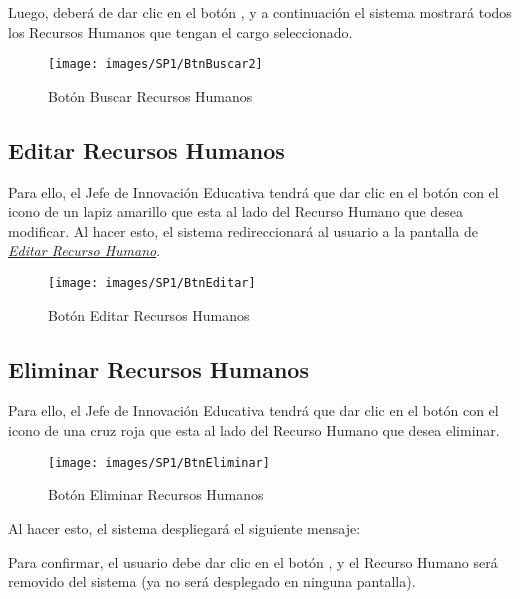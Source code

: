         	Luego, deberá de dar clic en el botón , y a continuación el sistema mostrará todos los Recursos Humanos que tengan el cargo seleccionado.
        	\begin{figure}[!hbtp]
        		\centering
        		\hypertarget{buscar}{\texttt{[image: images/SP1/BtnBuscar2]}}
        		\caption{Botón Buscar Recursos Humanos}
        		\label{buscar}
        	\end{figure}

	    \subsection{Editar Recursos Humanos}

        	Para ello, el Jefe de Innovación Educativa tendrá que dar clic en el botón con el icono de un lapiz amarillo que esta al lado del Recurso Humano que desea modificar. Al hacer esto, el sistema redireccionará al usuario a la pantalla de \hyperlink{editarrh}{\textit{Editar Recurso Humano}}.
        
        	\begin{figure}[!hbtp]
        		\centering
        		\hypertarget{editar}{\texttt{[image: images/SP1/BtnEditar]}}
        		\caption{Botón Editar Recursos Humanos}
        		\label{editar}
        	\end{figure}
    \newpage
	    
	    \subsection{Eliminar Recursos Humanos}

        	Para ello, el Jefe de Innovación Educativa tendrá que dar clic en el botón con el icono de una cruz roja que esta al lado del Recurso Humano que desea eliminar. 

        	\begin{figure}[!hbtp]
        		\centering
        		\hypertarget{eliminar}{\texttt{[image: images/SP1/BtnEliminar]}}
        		\caption{Botón Eliminar Recursos Humanos}
        		\label{eliminar}
        	\end{figure}
        
        	Al hacer esto, el sistema despliegará el siguiente mensaje:
        
        	Para confirmar, el usuario debe dar clic en el botón , y el Recurso Humano será removido del sistema (ya no será desplegado en ninguna pantalla).\\
        
